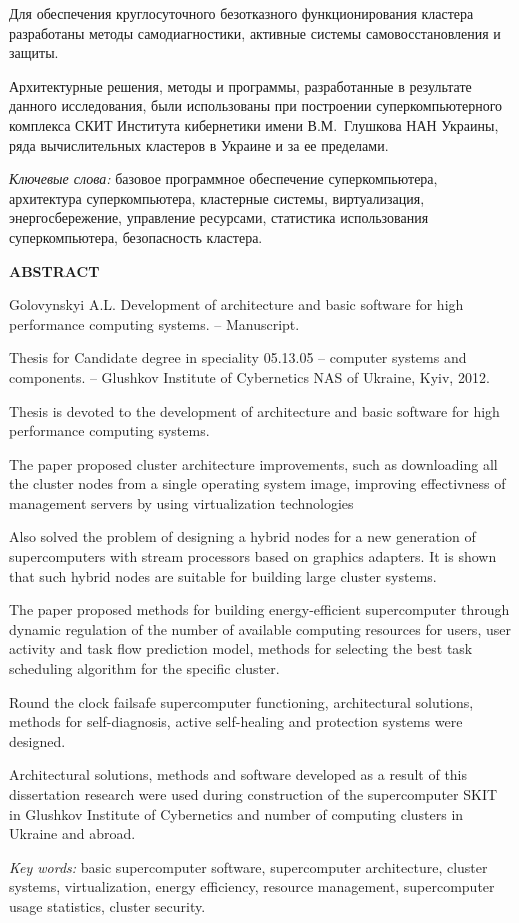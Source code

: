 Для обеспечения круглосуточного безотказного функционирования кластера разработаны методы самодиагностики, активные системы самовосстановления и защиты.

Архитектурные решения, методы и программы, разработанные в результате данного исследования, были использованы при построении суперкомпьютерного комплекса СКИТ Института кибернетики имени В.М.~Глушкова НАН Украины, ряда вычислительных кластеров в Украине и за ее пределами.

\textit{Ключевые слова:} базовое программное обеспечение суперкомпьютера, архитектура суперкомпьютера, кластерные системы, виртуализация, энергосбережение, управление ресурсами, статистика использования суперкомпьютера, безопасность кластера.

\vspace{0.5em}
\begin{center}
\textbf{ABSTRACT}
\end{center}

Golovynskyi A.L. Development of architecture and basic software for high performance computing systems. -- Manuscript.

Thesis for Candidate degree in speciality 05.13.05 -- computer systems and com\-po\-ne\-nts. -- Glushkov Institute of Cybernetics NAS of Ukraine, Kyiv, 2012.

Thesis is devoted to the development of architecture and basic software for high performance computing systems. 

The paper proposed cluster architecture improvements, such as downloading all the cluster nodes from a single operating system image, improving effectivness of management servers by using virtualization technologies

Also solved the problem of designing a hybrid nodes for a new generation of supercomputers with stream processors based on graphics adapters. It is shown that such hybrid nodes are suitable for building large cluster systems.

The paper proposed methods for building energy-efficient supercomputer through dynamic regulation of the number of available computing resources for users, user activity and task flow prediction model, methods for selecting the best task scheduling algorithm for the specific cluster.

Round the clock failsafe supercomputer functioning, ar\-chi\-tec\-tu\-ral solutions, methods for self-diagnosis, active self-healing and protection systems were designed.

Architectural solutions, methods and software developed as a result of this disser\-tation research were used during construction of the supercomputer SKIT in Glushkov Institute of Cybernetics and number of computing clusters in Ukraine and abroad.


\textit{Key words:} basic supercomputer software, supercomputer architecture, cluster systems, virtualization, energy efficiency, resource management, supercomputer usage statistics, cluster security. 


